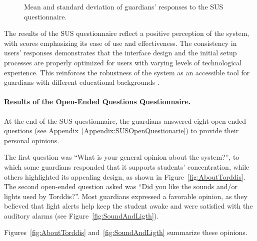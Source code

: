 \begin{figure}[h]
                    \caption{Mean and standard deviation of guardians' responses to the SUS questionnaire.}
                    \label{fig:sus-questionnaire}
                \end{figure}
                
                The results of the SUS questionnaire \citep{Brooke1996SUS} reflect a positive perception of the system, with scores emphasizing its ease of use and effectiveness. The consistency in users' responses demonstrates that the interface design and the initial setup processes are properly optimized for users with varying levels of technological experience. This reinforces the robustness of the system as an accessible tool for guardians with different educational backgrounds \citep{Deng2024Does}.
                
                \paragraph{Results of the Open-Ended Questions Questionnaire.}
                At the end of the SUS questionnaire, the guardians answered eight open-ended questions (see Appendix~\ref{Appendix:SUSOpenQuestionarie}) to provide their personal opinions.
                
                The first question was “What is your general opinion about the system?”, to which some guardians responded that it supports students' concentration, while others highlighted its appealing design, as shown in Figure~\ref{fig:AboutTorddis}. The second open-ended question asked was “Did you like the sounds and/or lights used by Torddis?”. Most guardians expressed a favorable opinion, as they believed that light alerts help keep the student awake and were satisfied with the auditory alarms (see Figure~\ref{fig:SoundAndLigth}).
                
                Figures~\ref{fig:AboutTorddis} and~\ref{fig:SoundAndLigth} summarize these opinions.
                
